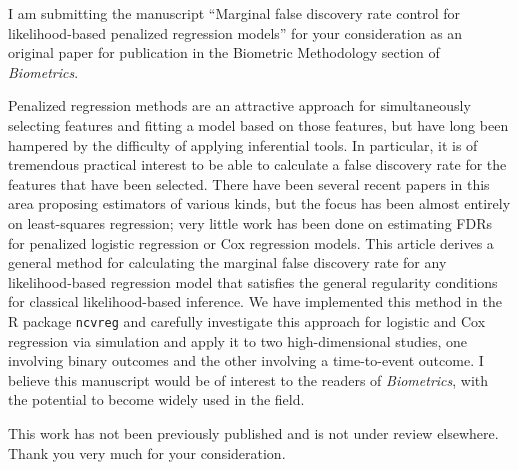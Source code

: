 \documentclass{uiletter}
\begin{document}

I am submitting the manuscript ``Marginal false discovery rate control for likelihood-based penalized regression models'' for your consideration as an original paper for publication in the Biometric Methodology section of {\em Biometrics}.  

Penalized regression methods are an attractive approach for simultaneously selecting features and fitting a model based on those features, but have long been hampered by the difficulty of applying inferential tools.  In particular, it is of tremendous practical interest to be able to calculate a false discovery rate for the features that have been selected.  There have been several recent papers in this area proposing estimators of various kinds, but the focus has been almost entirely on least-squares regression; very little work has been done on estimating FDRs for penalized logistic regression or Cox regression models.  This article derives a general method for calculating the marginal false discovery rate for any likelihood-based regression model that satisfies the general regularity conditions for classical likelihood-based inference.  We have implemented this method in the R package {\tt ncvreg} and carefully investigate this approach for logistic and Cox regression via simulation and apply it to two high-dimensional studies, one involving binary outcomes and the other involving a time-to-event outcome.  I believe this manuscript would be of interest to the readers of {\em Biometrics}, with the potential to become widely used in the field.

This work has not been previously published and is not under review elsewhere.  Thank you very much for your consideration.

\EndLetter
\end{document}
